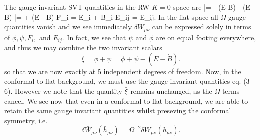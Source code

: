 \documentclass[10pt,letterpaper]{article}
\begin{document}
\\ \\
The gauge invariant SVT quantities  in the RW $K=0$ space are
\be
	\bar \phi = \phi - \frac{\dot \Omega}{\Omega}(\dot E-B) - (\ddot E - \dot B)
\ee
\be
	\bar \psi = \psi + \frac{\dot \Omega}{\Omega}(\dot E - B)
\ee
\be
	F_i = \dot E_i + B_i
\ee
\be
	E_{ij} = E_{ij}.
\ee
In the flat space all $\dot \Omega$ gauge quantities vanish and we see immediately $\delta W_{\mu\nu}$ can be expressed solely in terms of $\bar \phi, \bar \psi, F_i,$ and $E_{ij}$. In fact, we see that $\psi$ and $\phi$ are on equal footing everywhere, and thus we may combine the two invariant scalars
\[
	\bar \xi = \bar \phi + \bar \psi =  \phi + \psi - (\ddot E - \dot B).
\]
so that we are now exactly at 5 independent degrees of freedom. Now, in the conformal to flat background, we must use the gauge invariant quantities eq. (3-6). However we note that the quantity $\bar \xi$ remains unchanged, as the $\dot \Omega$ terms cancel. 
We see now that even in a conformal to flat background, we are able to retain the same gauge invariant quantities whilst preseving the conformal symmetry, i.e. 
\[
	\delta \bar W_{\mu\nu}(\bar h_{\mu\nu}) = \Omega^{-2} \delta W_{\mu\nu}(h_{\mu\nu}).
\]
\end{document}
